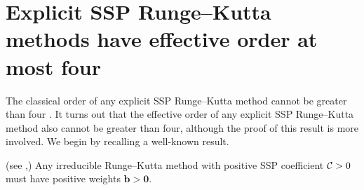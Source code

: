 \documentclass{siamltex}  %
\begin{document}
\section{Explicit SSP Runge--Kutta methods have effective order at most four}\label{sec:ExRK_barrier}
The classical order of any explicit SSP Runge--Kutta method cannot be greater
than four \cite{Ruuth2002}.
It turns out that the effective order of any explicit SSP Runge--Kutta method 
also cannot be greater than four, although the proof of this result is more
involved.
We begin by recalling a well-known result.
\begin{lemma}\label{lem:positive_b}(see \cite[Theorem~4.2]{Kraaijevanger1991},\cite[Lemma 4.2]{Ruuth2002})
	Any irreducible Runge--Kutta method with positive SSP coefficient $\mathcal{C}>0$
	must have positive weights $\bm{b} > \bm{0}$.
\end{lemma}
\end{document}
